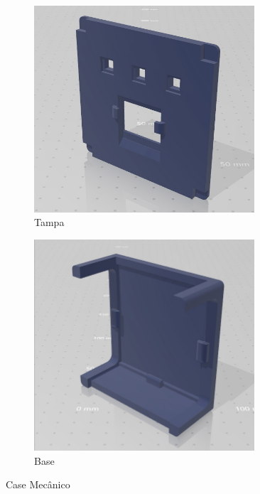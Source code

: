 \documentclass[../monografia.tex]{subfiles}
\begin{document}
\begin{figure}[h]
\centering
	\begin{subfigure}{0.5\textwidth}
		\centering
		\includegraphics[width=0.9\textwidth]{mec-tampa.jpeg}
		\caption{Tampa}
		\label{fig:tampa-mec}
	\end{subfigure}%
	\begin{subfigure}{0.5\textwidth}
		\centering
		\includegraphics[width=0.9\textwidth]{mec-base.jpeg}
		\caption{Base}
		\label{fig:base-mec}
	\end{subfigure}
	\caption{Case Mecânico}
	\label{fig:mecanicas}
\end{figure}
\end{document}
